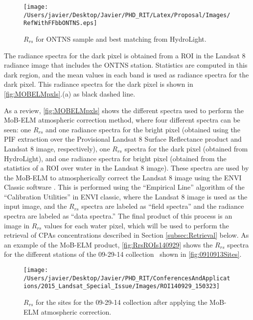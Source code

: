 \documentclass[onecolumn,3p]{elsarticle}
\begin{document}
\begin{figure}[htb]
  	\centering
  	\texttt{[image: /Users/javier/Desktop/Javier/PHD\_RIT/Latex/Proposal/Images/RefWithFFbbONTNS.eps]}
  \caption{$R_{rs}$ for ONTNS sample and best matching from HydroLight. \label{fig:BestMatchONTNS} } 
\end{figure}

The radiance spectra for the dark pixel is obtained from a ROI in the Landsat 8 radiance image that includes the ONTNS station. Statistics are computed in this dark region, and the mean values in each band is used as radiance spectra for the dark pixel. This radiance spectra for the dark pixel is shown in \autoref{fig:MOBELMpxls}.(a) as black dashed line.

As a review, \autoref{fig:MOBELMpxls} shows the different spectra used to perform the MoB-ELM atmospheric correction method, where four different spectra can be seen: one $R_{rs}$ and one radiance spectra for the bright pixel (obtained using the PIF extraction over the Provisional Landsat 8 Surface Reflectance product and Landsat 8 image, respectively), one $R_{rs}$ spectra for the dark pixel (obtained from HydroLight), and one radiance spectra for bright pixel (obtained from the statistics of a ROI over water in the Landsat 8 image). These spectra are used by the MoB-ELM to atmospherically correct the Landsat 8 image using the ENVI Classic software \cite{ENVIUserGuide}. This is performed using the ``Empirical Line'' algorithm of the ``Calibration Utilities'' in ENVI classic, where the Landsat 8 image is used as the input image, and the $R_{rs}$ spectra are labeled as ``field spectra'' and the radiance spectra are labeled as ``data spectra.'' The final product of this process is an image in $R_{rs}$ values for each water pixel, which will be used to perform the retrieval of CPAs concentrations described in Section \ref{subsec:Retrieval} below. As an example of the MoB-ELM product, \autoref{fig:RrsROIs140929} shows the $R_{rs}$ spectra for the different stations of the 09-29-14 collection~ shown in \autoref{fig:0910913Sites}.


\begin{figure}[htb]
  \centering
  \texttt{[image: /Users/javier/Desktop/Javier/PHD\_RIT/ConferencesAndApplications/2015\_Landsat\_Special\_Issue/Images/ROI140929\_150323]}

  \caption{$R_{rs}$ for the sites for the 09-29-14 collection after applying the MoB-ELM atmospheric correction.\label{fig:RrsROIs140929} } 
\end{figure}
\end{document}
